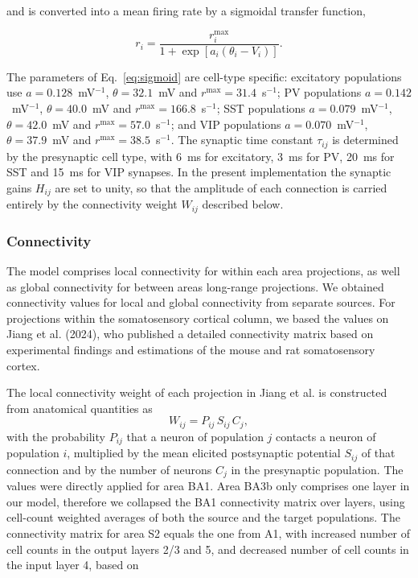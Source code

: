 \documentclass[11pt,a4paper,onecolumn]{article}
\begin{document}
and is converted into a mean firing rate by a sigmoidal transfer function,

\begin{equation}
\label{eq:sigmoid}
r_i=\frac{r_i^{\max}}
{1+\exp\left[a_i(\theta_i-V_i)\right]}.
\end{equation}

The parameters of Eq.~\eqref{eq:sigmoid} are cell-type specific: excitatory populations use $a=0.128$~mV$^{-1}$, $\theta=32.1$~mV and $r^{\max}=31.4$~s$^{-1}$; PV populations $a=0.142$~mV$^{-1}$, $\theta=40.0$~mV and $r^{\max}=166.8$~s$^{-1}$; SST populations $a=0.079$~mV$^{-1}$, $\theta=42.0$~mV and $r^{\max}=57.0$~s$^{-1}$; and VIP populations $a=0.070$~mV$^{-1}$, $\theta=37.9$~mV and $r^{\max}=38.5$~s$^{-1}$. The synaptic time constant $\tau_{ij}$ is determined by the presynaptic cell type, with 6~ms for excitatory, 3~ms for PV, 20~ms for SST and 15~ms for VIP synapses. In the present implementation the synaptic gains $H_{ij}$ are set to unity, so that the amplitude of each connection is carried entirely by the connectivity weight $W_{ij}$ described below.

\subsubsection*{Connectivity}
\vspace{-7pt}

The model comprises local connectivity for within each area projections, as well as global connectivity for between areas long-range projections. We obtained connectivity values for local and global connectivity from separate sources. For projections within the somatosensory cortical column, we based the values on Jiang et al. (2024), who published a detailed connectivity matrix based on experimental findings and estimations of the mouse and rat somatosensory cortex.

The local connectivity weight of each projection in Jiang et al. is constructed from anatomical quantities as
\begin{equation}
\label{eq:weights}
W_{ij}=P_{ij}\,S_{ij}\,C_j ,
\end{equation}
with the probability $P_{ij}$ that a neuron of population $j$ contacts a neuron of population $i$, multiplied by the mean elicited postsynaptic potential $S_{ij}$ of that connection and by the number of neurons $C_j$ in the presynaptic population. The values were directly applied for area BA1. Area BA3b only comprises one layer in our model, therefore we collapsed the BA1 connectivity matrix over layers, using cell-count weighted averages of both the source and the target populations. The connectivity matrix for area S2 equals the one from A1, with increased number of cell counts in the output layers 2/3 and 5, and decreased number of cell counts in the input layer 4, based on %
\end{document}
